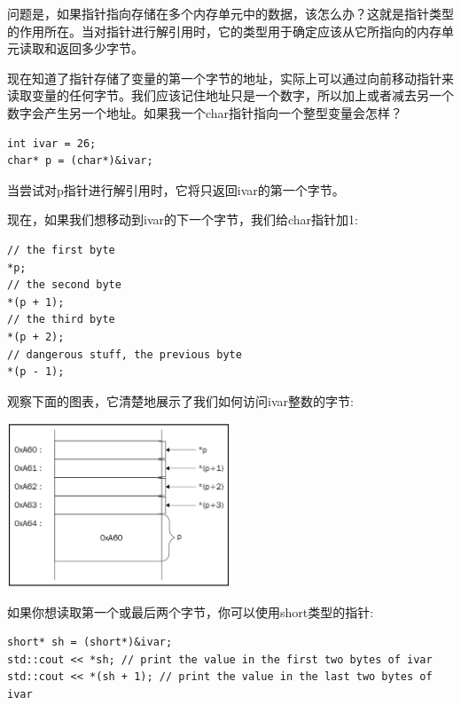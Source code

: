 问题是，如果指针指向存储在多个内存单元中的数据，该怎么办？这就是指针类型的作用所在。当对指针进行解引用时，它的类型用于确定应该从它所指向的内存单元读取和返回多少字节。 \par
现在知道了指针存储了变量的第一个字节的地址，实际上可以通过向前移动指针来读取变量的任何字节。我们应该记住地址只是一个数字，所以加上或者减去另一个数字会产生另一个地址。如果我一个char指针指向一个整型变量会怎样？ \par

\begin{lstlisting}[caption={}]
int ivar = 26;
char* p = (char*)&ivar;
\end{lstlisting}

当尝试对p指针进行解引用时，它将只返回ivar的第一个字节。\par
现在，如果我们想移动到ivar的下一个字节，我们给char指针加1: \par

\begin{lstlisting}[caption={}]
// the first byte
*p;
// the second byte
*(p + 1);
// the third byte
*(p + 2);
// dangerous stuff, the previous byte
*(p - 1);
\end{lstlisting}

观察下面的图表，它清楚地展示了我们如何访问ivar整数的字节:\par

\begin{center}
	\includegraphics[width=0.5\textwidth]{content/Section-1/Chapter-2/11}
\end{center}

如果你想读取第一个或最后两个字节，你可以使用short类型的指针: \par

\begin{lstlisting}[caption={}]
short* sh = (short*)&ivar;
std::cout << *sh; // print the value in the first two bytes of ivar
std::cout << *(sh + 1); // print the value in the last two bytes of ivar
\end{lstlisting}

